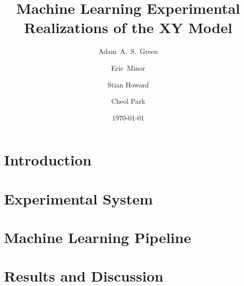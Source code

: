 \documentclass[prl,reprint,showpacs,floatfix,nofootinbib]{revtex4-1}
\begin{document}
\title{Machine Learning Experimental Realizations of the XY Model}

\date{\today}
\author{Adam~A.~S.~Green}
\author{Eric~Minor}
\author{Stian Howard}
\author{Cheol Park}


\begin{abstract}
    \blindtext{}
\end{abstract}

\maketitle

\section{Introduction}
\blindtext{}
\section{Experimental System}
\blindtext{}
\section{Machine Learning Pipeline}
\blindtext{}
\section{Results and Discussion}
\blindtext{}




%
%
\end{document}

